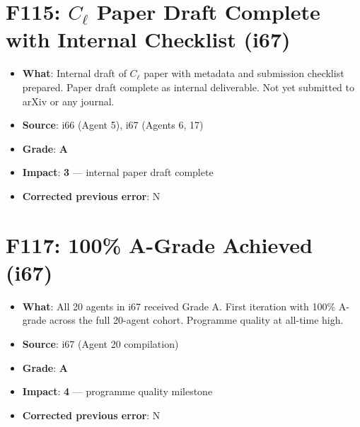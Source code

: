 \documentclass[11pt,a4paper]{article}
\newcommand{\grade}[1]{\textbf{#1}}
\newcommand{\impact}[1]{\textbf{#1}}
\begin{document}
\section{F115: $C_\ell$ Paper Draft Complete with Internal Checklist (i67)}
\begin{itemize}[nosep]
\item \textbf{What}: Internal draft of $C_\ell$ paper with metadata and submission checklist prepared. Paper draft complete as internal deliverable. Not yet submitted to arXiv or any journal.
\item \textbf{Source}: i66 (Agent 5), i67 (Agents 6, 17)
\item \textbf{Grade}: \grade{A}
\item \textbf{Impact}: \impact{3} --- internal paper draft complete
\item \textbf{Corrected previous error}: N
\end{itemize}


\section{F117: 100\% A-Grade Achieved (i67)}
\begin{itemize}[nosep]
\item \textbf{What}: All 20 agents in i67 received Grade A. First iteration with 100\% A-grade across the full 20-agent cohort. Programme quality at all-time high.
\item \textbf{Source}: i67 (Agent 20 compilation)
\item \textbf{Grade}: \grade{A}
\item \textbf{Impact}: \impact{4} --- programme quality milestone
\item \textbf{Corrected previous error}: N
\end{itemize}

\end{document}
